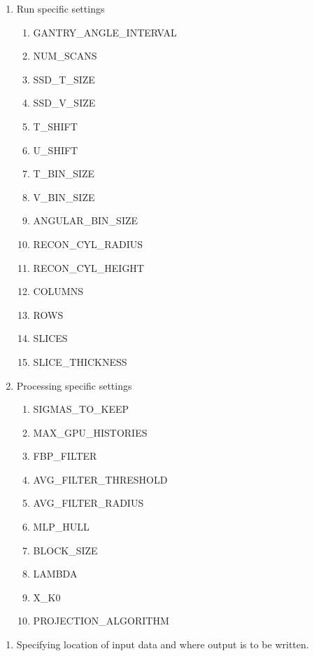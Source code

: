 \documentclass{article}
\begin{document}
\begin{enumerate}
    \item Run specific settings
    \begin{enumerate}
        \item GANTRY\_ANGLE\_INTERVAL
        \item NUM\_SCANS
        \item SSD\_T\_SIZE
        \item SSD\_V\_SIZE
        \item T\_SHIFT
        \item U\_SHIFT
        \item T\_BIN\_SIZE
        \item V\_BIN\_SIZE
        \item ANGULAR\_BIN\_SIZE
        \item RECON\_CYL\_RADIUS
        \item RECON\_CYL\_HEIGHT
        \item COLUMNS
        \item ROWS
        \item SLICES
        \item SLICE\_THICKNESS
    \end{enumerate}
    \item Processing specific settings
    \begin{enumerate}
        \item SIGMAS\_TO\_KEEP
        \item MAX\_GPU\_HISTORIES
        \item FBP\_FILTER
        \item AVG\_FILTER\_THRESHOLD
        \item AVG\_FILTER\_RADIUS
        \item MLP\_HULL
        \item BLOCK\_SIZE
        \item LAMBDA
        \item X\_K0
        \item PROJECTION\_ALGORITHM
    \end{enumerate}
\end{enumerate}
\begin{enumerate}[label = (\arabic*), leftmargin = 0.0cm, resume = section]
\bfseries
\item Specifying location of input data and where output is to be written.
\end{enumerate}
\end{document}
